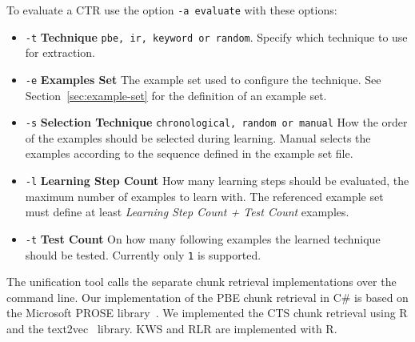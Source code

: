 \documentclass[\myrootdir/main.tex]{subfiles}
\begin{document}
To evaluate a CTR use the option \texttt{-a evaluate} with these options:
\begin{itemize}
    \item \texttt{-t} \textbf{Technique} \texttt{pbe, ir, keyword or random}. Specify which technique to use for extraction.
    \item \texttt{-e} \textbf{Examples Set} The example set used to configure the technique. See Section~\ref{sec:example-set} for the definition of an example set.
    \item \texttt{-s} \textbf{Selection Technique} \texttt{chronological, random or manual} How the order of the examples should be selected during learning.
    Manual selects the examples according to the sequence defined in the example set file.
    \item \texttt{-l} \textbf{Learning Step Count} How many learning steps should be evaluated, the maximum number of examples to learn with.
    The referenced example set must define at least \emph{Learning Step Count + Test Count} examples.
    \item \texttt{-t} \textbf{Test Count} On how many following examples the learned technique should be tested.
    Currently only \texttt{1} is supported.
\end{itemize}

The unification tool calls the separate chunk retrieval implementations over the command line.
Our implementation of the PBE chunk retrieval in C\# is based on the Microsoft PROSE library~\cite{prose2019webpage}.
We implemented the CTS chunk retrieval using R and the text2vec~\cite{text2vec2019webpage} library.
KWS and RLR are implemented with R.
\end{document}
